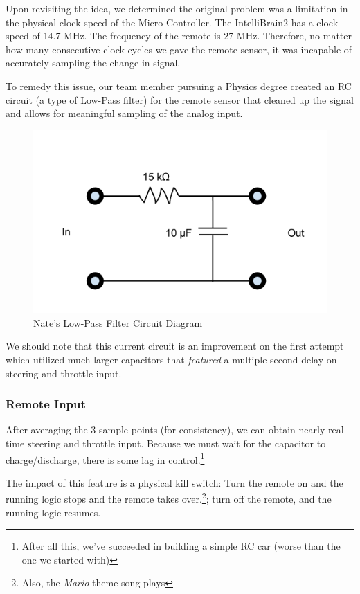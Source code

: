 \documentclass[12pt]{article}
\begin{document}
Upon revisiting the idea, we determined the original problem was a limitation in the physical clock speed of the Micro Controller.  The IntelliBrain2 has a clock speed of 14.7 MHz.  The frequency of the remote is 27 MHz.  Therefore, no matter how many consecutive clock cycles we gave the remote sensor, it was incapable of accurately sampling the change in signal.

To remedy this issue, our team member pursuing a Physics degree created an RC circuit (a type of Low-Pass filter) for the remote sensor that cleaned up the signal and allows for meaningful sampling of the analog input.  
\begin{figure}[h]
\centerline{\includegraphics[scale=.5]{img/circuit}}
\caption{Nate's Low-Pass Filter Circuit Diagram}
\end{figure}

We should note that this current circuit is an improvement on the first attempt which utilized much larger capacitors that \textit{featured} a multiple second delay on steering and throttle input.

\subsubsection*{Remote Input}
After averaging the 3 sample points (for consistency), we can obtain nearly real-time steering and throttle input.  Because we must wait for the capacitor to charge/discharge, there is some lag in control.\footnote{After all this, we've succeeded in building a simple RC car (worse than the one we started with)}

The impact of this feature is a physical kill switch: Turn the remote on and the running logic stops and the remote takes over.\footnote{Also, the \textit{Mario} theme song plays}; turn off the remote, and the running logic resumes.
\end{document}
